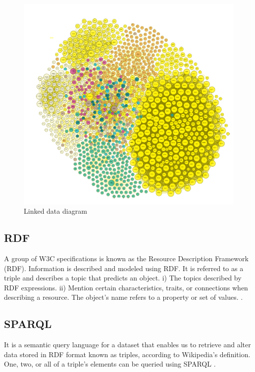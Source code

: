 \begin{center}
	\begin{figure}[htb!]
		
		\begin{minipage}{0.55\linewidth}
			\centering
			\includegraphics[width=1.55\textwidth]{images/chap02_LinkData.png}
		\end{minipage}
		\caption[Linked data diagram]{Linked data diagram \cite{Hector}}
		
		
	\end{figure}
	
\end{center}
\subsection{RDF}
A group of W3C specifications is known as the Resource Description Framework (RDF). Information is described and modeled using RDF. It is referred to as a triple and describes a topic that predicts an object.
i) The topics described by RDF expressions.
ii) Mention certain characteristics, traits, or connections when describing a resource.
The object's name refers to a property or set of values. \cite{Hector}.
\subsection{SPARQL}
It is a semantic query language for a dataset that enables us to retrieve and alter data stored in RDF format known as triples, according to Wikipedia's definition. One, two, or all of a triple's elements can be queried using SPARQL \cite{Hector}.

